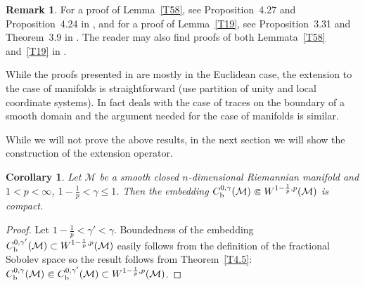 \documentclass[intlimits,12pt,reqno]{amsart}
\newcommand{\cM}{\mathcal M}
\numberwithin{equation}{section}
\newtheorem{corollary}[theorem]{Corollary}
\theoremstyle{definition}
\newtheorem{remark}[theorem]{Remark}
\begin{document}
\begin{remark}
\label{R7}
For a proof of Lemma~\ref{T58}, see Proposition~4.27 and Proposition~4.24 in \cite{demengel}, and for a proof of Lemma~\ref{T19}, see Proposition~3.31 and Theorem~3.9 in \cite{demengel}. 
The reader may also find proofs of both Lemmata~\ref{T58} and~\ref{T19} in \cite{leoni}. 

While the proofs presented in \cite{demengel} are mostly in the Euclidean case, the extension to the case of manifolds is straightforward (use partition of unity and local coordinate systems). In fact \cite[Proposition~3.31]{demengel} deals with the case of traces on the boundary of a smooth domain and the argument needed for the case of manifolds is similar.

While we will not prove the above results, in the next section we will show the construction of the extension operator. 
\end{remark}



\begin{corollary}
\label{T60}
Let $\cM$ be a smooth closed $n$-dimensional Riemannian manifold and $1<p<\infty$, $1-\frac{1}{p}<\gamma\leq 1$. Then the embedding $C_{\rm b}^{0,\gamma}(\cM)\Subset W^{1-\frac{1}{p},p}(\cM)$ is compact.
\end{corollary}
\begin{proof}
Let  $1-\frac{1}{p}<\gamma'<\gamma$. Boundedness of the embedding 
$C_{\rm b}^{0,\gamma'}(\cM)\subset W^{1-\frac{1}{p},p}(\cM)$ easily follows from the definition of the fractional Sobolev space so the result follows from Theorem~\ref{T4.5}: 
$C_{\rm b}^{0,\gamma}(\cM)\Subset C_{\rm b}^{0,\gamma'}(\cM)\subset W^{1-\frac{1}{p},p}(\cM)$.
\end{proof}
\end{document}
